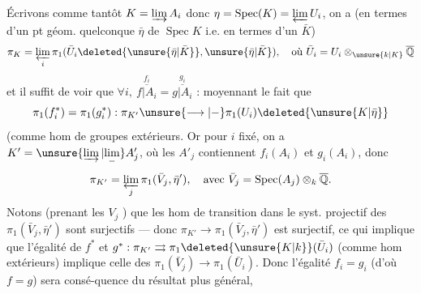Écrivons comme tantôt $K=\varinjlim A_i$ donc  $\eta=\operatorname{Spec}(K)=\varprojlim U_i$, on a (en termes d'un pt géom. quelconque $\bar\eta$ de $\operatorname{Spec}K$ i.e. en termes d'un $\bar K$)
\[
\pi_K=\varprojlim_i\pi_1(\bar U_i\deleted{\unsure{\bar\eta|\bar K}},\unsure{\bar\eta|\bar K}),\quad\text{où }\bar U_i=U_i\otimes_{\unsure{k|K}}\overline{\mathbb Q}
\]
et il suffit de voir que $\forall i,\ \overset{f_i}{\overline{f|A_i}}=\overset{g_i}{\overline{g|A_i}}$ : moyennant le fait que
\[
\pi_1(f_i^*)=\pi_1(g_i^*):\pi_{K'}\unsure{\longrightarrow|-}\pi_1(U_i)\deleted{\unsure{K|\bar\eta}}
\]
(comme hom de groupes extérieurs. Or pour $i$ fixé, on a $K'=\unsure{\varinjlim|\underset{-}{\lim}} A'_j$, où les $A'_j$ contiennent $f_i(A_i)$ et $g_i(A_i)$, donc
\[
\pi_{K'}=\varprojlim_j\pi_1(\bar V_j,\bar\eta'),\quad\text{avec }\bar V_j=\operatorname{Spec}(A_j)\otimes_k\overline{\mathbb Q}.
\]
Notons (prenant les $V_j$ ) que les hom de transition dans le syst. projectif des $\pi_1(\bar V_j,\bar\eta')$ sont surjectifs --- donc  $\pi_{K'}\longrightarrow\pi_1(\bar V_j,\bar\eta')$ est surjectif, ce qui implique que l'égalité de $f^*$ et $g^*:\pi_{K'}\rightrightarrows\pi_1\deleted{\unsure{K|k}}(\bar U_i)$ (comme hom extérieurs) implique celle des $\pi_1(\bar V_j)\longrightarrow\pi_1(\bar U_i)$.
Donc l'égalité $f_i=g_i$ (d'où $f=g$) sera consé-quence du résultat plus général,
